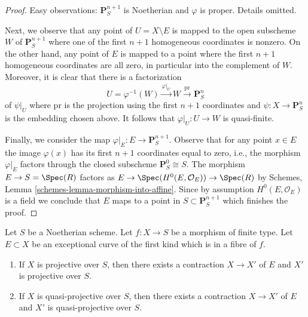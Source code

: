 \begin{proof}
\medskip\noindent
Easy observations: $\mathbf{P}^{n + 1}_S$ is Noetherian and $\varphi$ is proper.
Details omitted.

\medskip\noindent
Next, we observe that any point of $U = X \setminus E$ is mapped
to the open subscheme $W$ of $\mathbf{P}^{n + 1}_S$ where one of the
first $n + 1$ homogeneous coordinates is nonzero. On the other hand,
any point of $E$ is mapped to a point where the first $n + 1$ homogeneous
coordinates are all zero, in particular into the complement of $W$.
Moreover, it is clear that there is a factorization
$$
U = \varphi^{-1}(W) \xrightarrow{\varphi|_U}
W \xrightarrow{\text{pr}} \mathbf{P}^n_S
$$
of $\psi|_U$ where $\text{pr}$ is the projection using the first
$n + 1$ coordinates and $\psi : X \to \mathbf{P}^n_S$ is the embedding chosen
above. It follows that $\varphi|_U : U \to W$ is quasi-finite.

\medskip\noindent
Finally, we consider the map $\varphi|_E : E \to \mathbf{P}^{n + 1}_S$.
Observe that for any point $x \in E$ the image $\varphi(x)$
has its first $n + 1$ coordinates equal to zero, i.e., the morphism
$\varphi|_E$ factors through the closed subscheme
$\mathbf{P}^0_S \cong S$. The morphism $E \to S = \Spec(R)$
factors as $E \to \Spec(H^0(E, \mathcal{O}_E)) \to \Spec(R)$
by Schemes, Lemma \ref{schemes-lemma-morphism-into-affine}.
Since by assumption $H^0(E, \mathcal{O}_E)$ is a field we conclude
that $E$ maps to a point in $S \subset \mathbf{P}^{n + 1}_S$
which finishes the proof.
\end{proof}

\begin{lemma}
\label{lemma-contract-when-quasi-projective}
Let $S$ be a Noetherian scheme. Let $f : X \to S$ be a morphism of finite type.
Let $E \subset X$ be an exceptional curve of the first kind which is in a
fibre of $f$.
\begin{enumerate}
\item If $X$ is projective over $S$, then there exists a contraction
$X \to X'$ of $E$ and $X'$ is projective over $S$.
\item If $X$ is quasi-projective over $S$, then there exists a contraction
$X \to X'$ of $E$ and $X'$ is quasi-projective over $S$.
\end{enumerate}
\end{lemma}

